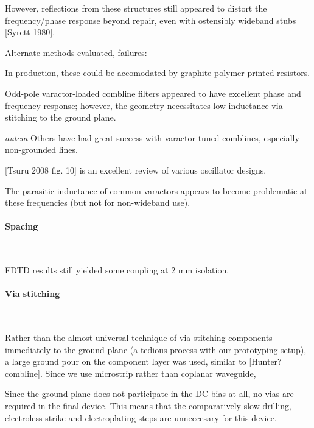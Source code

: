 \documentclass[fleqn,10pt]{article}
\begin{document}
\begin{multicols}{1}
However, reflections from these structures still appeared to distort the frequency/phase response beyond repair, even with ostensibly wideband stubs [Syrett 1980].

\noindent{}

Alternate methods evaluated, failures: 


In production, these could be accomodated by graphite-polymer printed resistors. 


Odd-pole varactor-loaded combline filters appeared to have excellent phase and frequency response; however, the geometry necessitates low-inductance via stitching to the ground plane.

\begin{autem}
	{\it autem} Others have had great success with varactor-tuned comblines, especially non-grounded lines.
\end{autem}

[Tsuru 2008 fig. 10] is an excellent review of various oscillator designs.

The parasitic inductance of common varactors appears to become problematic at these frequencies (but not for non-wideband use).

\paragraph{\textbf{Spacing}}\

FDTD results still yielded some coupling at 2 mm isolation.

\paragraph{\textbf{Via stitching}}\

Rather than the almost universal technique of via stitching components immediately to the ground plane (a tedious process with our prototyping setup), a large ground pour on the component layer was used, similar to [Hunter? combline]. Since we use microstrip rather than coplanar waveguide, 

Since the ground plane does not participate in the DC bias at all, no vias are required in the final device. This means that the comparatively slow drilling, electroless strike and electroplating steps are unneccesary for this device.





\end{multicols}
\end{document}
